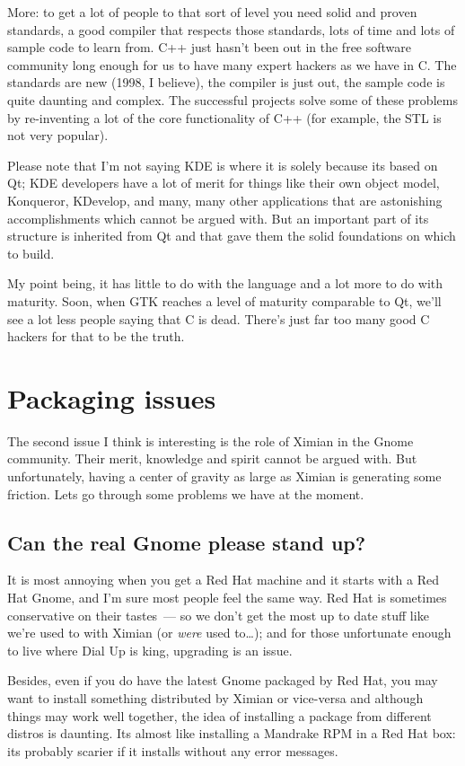 \documentclass{book}
\begin{document}
More: to get a lot of people to that sort of level you need solid and
proven standards, a good compiler that respects those standards, lots
of time and lots of sample code to learn from. C++ just hasn't been
out in the free software community long enough for us to have many
expert hackers as we have in C. The standards are new (1998, I
believe), the compiler is just out, the sample code is quite daunting
and complex. The successful projects solve some of these problems by
re-inventing a lot of the core functionality of C++ (for example, the
STL is not very popular).

Please note that I'm not saying KDE is where it is solely because its
based on Qt; KDE developers have a lot of merit for things like their
own object model, Konqueror, KDevelop, and many, many other
applications that are astonishing accomplishments which cannot be
argued with. But an important part of its structure is inherited from
Qt and that gave them the solid foundations on which to build.

My point being, it has little to do with the language and a lot more
to do with maturity. Soon, when GTK reaches a level of maturity
comparable to Qt, we'll see a lot less people saying that C is
dead. There's just far too many good C hackers for that to be the
truth.

\section{Packaging issues}

The second issue I think is interesting is the role of Ximian in the
Gnome community. Their merit, knowledge and spirit cannot be argued
with. But unfortunately, having a center of gravity as large as Ximian
is generating some friction. Lets go through some problems we have at
the moment.

\subsection{Can the real Gnome please stand up?}

It is most annoying when you get a Red Hat machine and it starts with
a Red Hat Gnome, and I'm sure most people feel the same way. Red Hat
is sometimes conservative on their tastes~--- so we don't get the most
up to date stuff like we're used to with Ximian (or \emph{were} used
to\ldots); and for those unfortunate enough to live where Dial Up is
king, upgrading is an issue.

Besides, even if you do have the latest Gnome packaged by Red Hat, you
may want to install something distributed by Ximian or vice-versa and
although things may work well together, the idea of installing a
package from different distros is daunting. Its almost like installing
a Mandrake RPM in a Red Hat box: its probably scarier if it installs
without any error messages.
\end{document}
